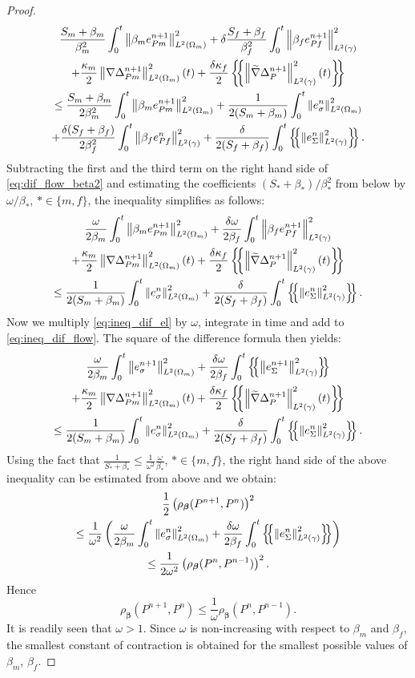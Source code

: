 \documentclass[a4paper]{article}
\numberwithin{equation}{section}
\def\agrad{\widetilde\nabla}
\def\avg#1{\left\{\mskip-5mu\left\{#1\right\}\mskip-5mu\right\}}
\def\bbeta{\boldsymbol{\beta}}
\def\norm#1{\left\|#1\right\|}
\newcommand{\eqs}[1]{\begin{equation*}#1\end{equation*}}
\newcommand{\ml}[1]{\begin{multline}#1\end{multline}}
\newcommand{\mls}[1]{\begin{multline*}#1\end{multline*}}
\begin{document}
\begin{proof}
\ml{ 
    \label{eq:dif_flow_beta2}
    \frac{S_m+\beta_m}{\beta_m^2}\int_0^t\norm{\beta_m e_{Pm}^{n+1}}_{L^2(\Omega_m)}^2 
    + \delta\frac{S_f+\beta_f}{\beta_f^2}\int_0^t\norm{\beta_f e_{Pf}^{n+1}}_{L^2(\gamma)}^2\\
    + \frac{\kappa_m}2\norm{\nabla\Delta_{Pm}^{n+1}}_{L^2(\Omega_m)}^2(t) 
    + \frac{\delta\kappa_f}2\avg{\norm{\agrad\Delta_P^{n+1}}_{L^2(\gamma)}^2(t)}\\
    \le \frac{S_m+\beta_m}{2\beta_m^2}\int_0^t\norm{\beta_m e_{Pm}^{n+1}}_{L^2(\Omega_m)}^2 
    + \frac1{2(S_m+\beta_m)}\int_0^t\norm{e_\sigma^n}_{L^2(\Omega_m)}^2\\
    + \frac{\delta(S_f+\beta_f)}{2\beta_f^2}\int_0^t\norm{\beta_f e_{Pf}^n}_{L^2(\gamma)}^2 
    + \frac\delta{2(S_f+\beta_f)}\int_0^t\avg{\norm{e_\Sigma^n}_{L^2(\gamma)}^2}. 
}
%
Subtracting the first and the third term on the right hand side of \eqref{eq:dif_flow_beta2} and estimating the coefficients $(S_*+\beta_*)/\beta_*^2$ from below by $\omega/\beta_*$, $*\in\{m,f\}$, the inequality simplifies as follows:
\ml{
    \label{eq:ineq_dif_flow} 
    \frac\omega{2\beta_m}\int_0^t\norm{\beta_m e_{Pm}^{n+1}}_{L^2(\Omega_m)}^2 
    + \frac{\delta\omega}{2\beta_f}\int_0^t\norm{\beta_f e_{Pf}^{n+1}}_{L^2(\gamma)}^2\\
    + \frac{\kappa_m}2\norm{\nabla\Delta_{Pm}^{n+1}}_{L^2(\Omega_m)}^2(t) 
    + \frac{\delta\kappa_f}2\avg{\norm{\agrad\Delta_P^{n+1}}_{L^2(\gamma)}^2(t)}\\
    \le \frac1{2(S_m+\beta_m)}\int_0^t\norm{e_\sigma^n}_{L^2(\Omega_m)}^2
    + \frac\delta{2(S_f+\beta_f)}\int_0^t\avg{\norm{e_\Sigma^n}_{L^2(\gamma)}^2}. 
}
Now we multiply \eqref{eq:ineq_dif_el} by $\omega$, integrate in time and add to \eqref{eq:ineq_dif_flow}.
The square of the difference formula then yields:
\mls{
    \frac\omega{2\beta_m}\int_0^t\norm{e_\sigma^{n+1}}_{L^2(\Omega_m)}^2 
    + \frac{\delta\omega}{2\beta_f}\int_0^t\avg{\norm{e_\Sigma^{n+1}}_{L^2(\gamma)}^2}\\
    + \frac{\kappa_m}2\norm{\nabla\Delta_{Pm}^{n+1}}_{L^2(\Omega_m)}^2(t) 
    + \frac{\delta\kappa_f}2\avg{\norm{\agrad\Delta_P^{n+1}}_{L^2(\gamma)}^2(t)}\\
    \le \frac1{2(S_m+\beta_m)}\int_0^t\norm{e_\sigma^n}_{L^2(\Omega_m)}^2
    + \frac\delta{2(S_f+\beta_f)}\int_0^t\avg{\norm{e_\Sigma^n}_{L^2(\gamma)}^2}. 
}
%
Using the fact that $\frac1{S_*+\beta_*}\le\frac1{\omega^2}\frac{\omega}{\beta_*}$, $*\in\{m,f\}$, the right hand side of the above inequality can be estimated from above and we obtain:
\mls{ \frac12\left(\rho_{\bbeta}(P^{n+1},P^n)\right)^2\\
\le \frac1{\omega^2}\left(\frac\omega{2\beta_m}\int_0^t\norm{e_\sigma^n}_{L^2(\Omega_m)}^2
+ \frac{\delta\omega}{2\beta_f}\int_0^t\avg{\norm{e_\Sigma^n}_{L^2(\gamma)}^2}\right)\\
\le \frac1{2\omega^2}\left(\rho_{\bbeta}(P^n,P^{n-1})\right)^2. }
Hence
\eqs{ \rho_{\bbeta}(P^{n+1},P^n) \le \frac1\omega \rho_{\bbeta}(P^n,P^{n-1}). }
It is readily seen that $\omega>1$.
Since $\omega$ is non-increasing with respect to $\beta_m$ and $\beta_f$, the smallest constant of contraction is obtained for the smallest possible values of $\beta_m$, $\beta_f$.
\end{proof}
\end{document}
